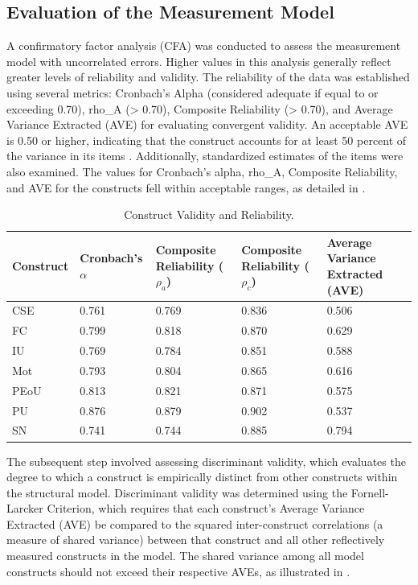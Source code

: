 \documentclass[english]{textolivre}
\begin{document}
\subsection{Evaluation of the Measurement Model}\label{sec-secoes}
A confirmatory factor analysis (CFA) was conducted to assess the measurement model with uncorrelated errors. Higher values in this analysis generally reflect greater levels of reliability and validity. The reliability of the data was established using several metrics: Cronbach’s Alpha (considered adequate if equal to or exceeding 0.70), rho\_A (> 0.70), Composite Reliability (> 0.70), and Average Variance Extracted (AVE) for evaluating convergent validity. An acceptable AVE is 0.50 or higher, indicating that the construct accounts for at least 50 percent of the variance in its items \cite{HairHowardNitzl2020CCA}. Additionally, standardized estimates of the items were also examined. The values for Cronbach’s alpha, rho\_A, Composite Reliability, and AVE for the constructs fell within acceptable ranges, as detailed in .

\begin{table}[htbp]
\centering
\begin{threeparttable}
\caption{Construct Validity and Reliability.}
\label{tab5}
\begin{tabular}{p{} p{2cm} p{2cm} p{2cm} p{2cm}}
\toprule
Construct &
Cronbach's $\alpha$ &
Composite Reliability ($\rho_a$) &
Composite Reliability ($\rho_c$) &
Average Variance Extracted (AVE) \\
\midrule
CSE  & 0.761 & 0.769 & 0.836 & 0.506 \\
FC   & 0.799 & 0.818 & 0.870 & 0.629 \\
IU   & 0.769 & 0.784 & 0.851 & 0.588 \\
Mot  & 0.793 & 0.804 & 0.865 & 0.616 \\
PEoU & 0.813 & 0.821 & 0.871 & 0.575 \\
PU   & 0.876 & 0.879 & 0.902 & 0.537 \\
SN   & 0.741 & 0.744 & 0.885 & 0.794 \\
\bottomrule
\end{tabular}
\centering
\end{threeparttable}
\end{table}

The subsequent step involved assessing discriminant validity, which evaluates the degree to which a construct is empirically distinct from other constructs within the structural model. Discriminant validity was determined using the Fornell-Larcker Criterion, which requires that each construct’s Average Variance Extracted (AVE) be compared to the squared inter-construct correlations (a measure of shared variance) between that construct and all other reflectively measured constructs in the model. The shared variance among all model constructs should not exceed their respective AVEs, as illustrated in .
\end{document}
